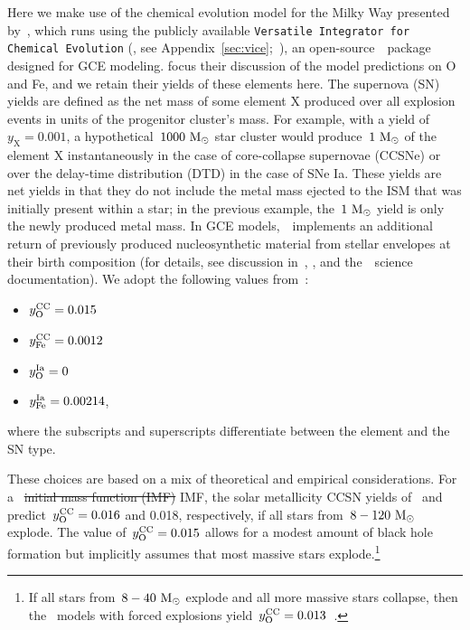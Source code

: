 \documentclass[ms.tex]{subfiles}
\begin{document}
Here we make use of the chemical evolution model for the Milky Way
presented by~\citet{Johnson2021}, which runs using the publicly available
\texttt{Versatile Integrator for Chemical Evolution}
(\vice, see Appendix~\ref{sec:vice};~\citealp{Johnson2020, Griffith2021,
Johnson2021}), an open-source~\python~package designed for GCE modeling.
\citet{Johnson2021} focus their discussion of the model predictions on O and
Fe, and we retain their yields of these elements here.
The supernova (SN) yields are defined as the net mass of some element X
produced over all explosion events in units of the progenitor cluster's mass.
For example, with a yield of~$y_\text{X} = 0.001$, a hypothetical~$1000~\text{M}_\odot$
star cluster would produce~$1~\text{M}_\odot$ of the element X instantaneously in the
case of core-collapse supernovae (CCSNe) or over the delay-time distribution
(DTD) in the case of SNe Ia.
These yields are net yields in that they do not include the metal mass
ejected to the ISM that was initially present within a star; in the previous
example, the~$1~\text{M}_\odot$ yield is only the newly produced metal mass.
{\color{red} In GCE models,~\vice~implements an additional return of
previously produced nucleosynthetic material from stellar envelopes at their
birth composition (for details, see discussion in~\citealt{Johnson2020},
\citealt{Johnson2021}, and the~\vice~science documentation).
}
We adopt the following values from~\citet{Johnson2021}:
\begin{itemize}
	\item $y_\text{O}^\text{CC} = 0.015$

	\item $y_\text{Fe}^\text{CC} = 0.0012$

	\item $y_\text{O}^\text{Ia} = 0$

	\item $y_\text{Fe}^\text{Ia} = 0.00214$,
\end{itemize}
where the subscripts and superscripts differentiate between the element and the
SN type.
\par
These choices are based on a mix of theoretical and empirical considerations.
For a~\citet{Kroupa2001} {\color{red} \sout{initial mass function (IMF)} IMF},
the solar metallicity
CCSN yields of~\citet{Chieffi2013} and~\citet[][based on
the~\citealp{Sukhbold2016} models with forced explosion]{Griffith2021}
predict~$y_\text{O}^\text{CC} = 0.016$ and 0.018, respectively, if all stars
from~$8 - 120~\text{M}_\odot$ explode.
The value of~$y_\text{O}^\text{CC} = 0.015$ allows for a modest amount of black hole
formation but implicitly assumes that most massive stars explode.\footnote{
	If all stars from~$8 - 40~\text{M}_\odot$ explode and all more massive stars
	collapse, then the~\citet{Sukhbold2016} models with forced explosions
	yield~$y_\text{O}^\text{CC} = 0.013$~\citep{Griffith2021}.
}
\end{document}
